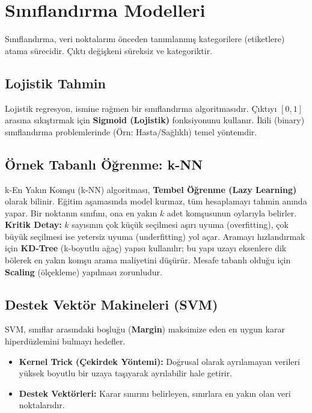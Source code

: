 \documentclass[12pt,a4paper]{article}
\begin{document}
\newpage
\section{Sınıflandırma Modelleri}
Sınıflandırma, veri noktalarını önceden tanımlanmış kategorilere (etiketlere) atama sürecidir. Çıktı değişkeni süreksiz ve kategoriktir.

\subsection{Lojistik Tahmin}
Lojistik regresyon, ismine rağmen bir sınıflandırma algoritmasıdır. Çıktıyı $[0, 1]$ arasına sıkıştırmak için \textbf{Sigmoid (Lojistik)} fonksiyonunu kullanır. İkili (binary) sınıflandırma problemlerinde (Örn: Hasta/Sağlıklı) temel yöntemdir.

\subsection{Örnek Tabanlı Öğrenme: k-NN}
k-En Yakın Komşu (k-NN) algoritması, \textbf{Tembel Öğrenme (Lazy Learning)} olarak bilinir. Eğitim aşamasında model kurmaz, tüm hesaplamayı tahmin anında yapar. Bir noktanın sınıfını, ona en yakın $k$ adet komşusunun oylarıyla belirler.
\\ \textbf{Kritik Detay:} $k$ sayısının çok küçük seçilmesi aşırı uyuma (overfitting), çok büyük seçilmesi ise yetersiz uyuma (underfitting) yol açar. Aramayı hızlandırmak için \textbf{KD-Tree} (k-boyutlu ağaç) yapısı kullanılır; bu yapı uzayı eksenlere dik bölerek en yakın komşu arama maliyetini düşürür. Mesafe tabanlı olduğu için \textbf{Scaling} (ölçekleme) yapılması zorunludur.

\subsection{Destek Vektör Makineleri (SVM)}
SVM, sınıflar arasındaki boşluğu (\textbf{Margin}) maksimize eden en uygun karar hiperdüzlemini bulmayı hedefler.
\begin{itemize}
    \item \textbf{Kernel Trick (Çekirdek Yöntemi):} Doğrusal olarak ayrılamayan verileri yüksek boyutlu bir uzaya taşıyarak ayrılabilir hale getirir.
    \item \textbf{Destek Vektörleri:} Karar sınırını belirleyen, sınırlara en yakın olan veri noktalarıdır.
\end{itemize}
\end{document}
